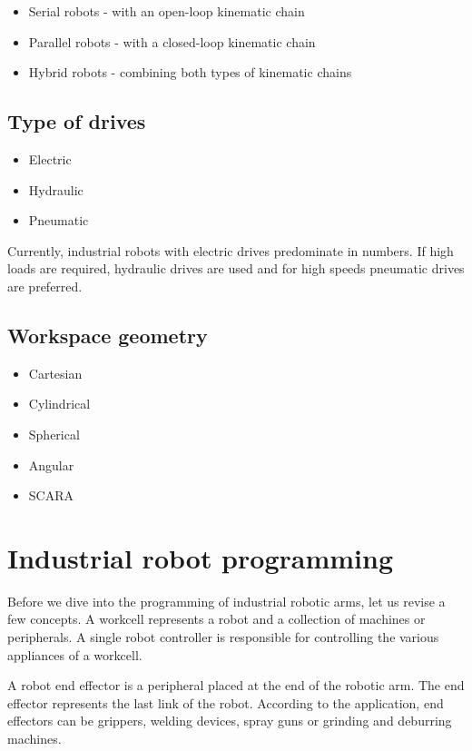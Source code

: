 \begin{itemize}
    \item Serial robots - with an open-loop kinematic chain
    \item Parallel robots - with a closed-loop kinematic chain
    \item Hybrid robots - combining both types of kinematic chains
\end{itemize}


\subsection*{Type of drives}

\begin{itemize}
    \item Electric
    \item Hydraulic
    \item Pneumatic
\end{itemize}

Currently, industrial robots with electric drives predominate in numbers. If high loads are required, hydraulic drives are used and for high speeds pneumatic drives are preferred.

\subsection*{Workspace geometry}

\begin{itemize}
    \item Cartesian
    \item Cylindrical
    \item Spherical
    \item Angular
    \item SCARA
\end{itemize}

\section{Industrial robot programming}

Before we dive into the programming of industrial robotic arms, let us revise a few concepts.
A workcell represents a robot and a collection of machines or peripherals. A single robot controller is responsible for controlling the various appliances of a workcell.

A robot end effector is a peripheral placed at the end of the robotic arm. The end effector represents the last link of the robot. According to the application, end effectors can be grippers, welding devices, spray guns or grinding and deburring machines.

